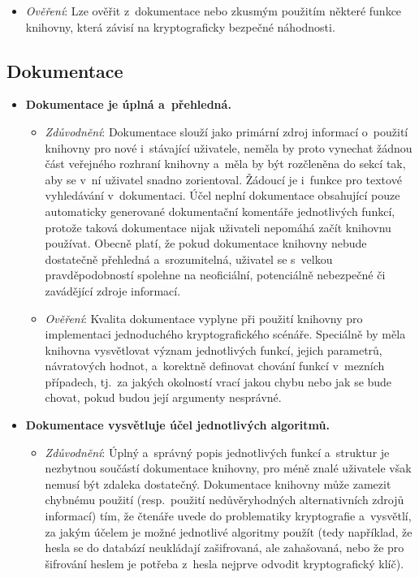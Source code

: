 \begin{itemize}
\begin{itemize}[beginpenalty=10000]
        \item \textit{Ověření}: Lze ověřit z~dokumentace nebo zkusmým použitím některé funkce knihovny, která závisí na kryptograficky bezpečné náhodnosti.
    \end{itemize}
\end{itemize}

\subsection{Dokumentace}

\begin{itemize}
    \item \textbf{Dokumentace je úplná a~přehledná.} 
    \begin{itemize}[beginpenalty=10000]
        \item \textit{Zdůvodnění}: Dokumentace slouží jako primární zdroj informací o~použití knihovny pro nové i~stávající uživatele, neměla by proto vynechat žádnou část veřejného rozhraní knihovny a~měla by být rozčleněna do sekcí tak, aby se v~ní uživatel snadno zorientoval. Žádoucí je i~funkce pro textové vyhledávání v~dokumentaci. Účel neplní dokumentace obsahující pouze automaticky generované dokumentační komentáře jednotlivých funkcí, protože taková dokumentace nijak uživateli nepomáhá začít knihovnu používat. Obecně platí, že pokud dokumentace knihovny nebude dostatečně přehledná a~srozumitelná, uživatel se s~velkou pravděpodobností spolehne na neoficiální, potenciálně nebezpečné či zavádějící zdroje informací.

        \item \textit{Ověření}: Kvalita dokumentace vyplyne při použití knihovny pro implementaci jedno\-du\-ché\-ho kryptografického scénáře. Speciálně by měla knihovna vysvětlovat význam jednotlivých funkcí, jejich parametrů, návratových hodnot, a~korektně definovat chování funkcí v~mez\-ních případech, tj.~za jakých okolností vrací jakou chybu nebo jak se bude chovat, pokud budou její argumenty nesprávné.
    \end{itemize}

    \item \textbf{Dokumentace vysvětluje účel jednotlivých algoritmů.} 
    \begin{itemize}[beginpenalty=10000]
        \item \textit{Zdůvodnění}: Úplný a~správný popis jednotlivých funkcí a~struktur je nezbytnou součástí dokumentace knihovny, pro méně znalé uživatele však nemusí být zdaleka dostatečný. Dokumentace knihovny může zamezit chybnému použití (resp.\ použití nedůvěryhodných alternativních zdrojů informací) tím, že čtenáře uvede do problematiky kryptografie a~vysvětlí, za jakým účelem je možné jednotlivé algoritmy použít (tedy například, že hesla se do databází neukládají zašifrovaná, ale zahašovaná, nebo že pro šifrování heslem je potřeba z~hesla nejprve odvodit kryptografický klíč).


\end{itemize}
\end{itemize}
